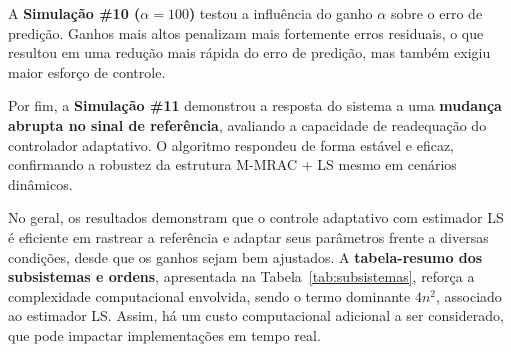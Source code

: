 \documentclass[10pt]{article}
\begin{document}
A \textbf{Simulação \#10 ($\alpha = 100$)} testou a influência do ganho $\alpha$ sobre o erro de predição. Ganhos mais altos penalizam mais fortemente erros residuais, o que resultou em uma redução mais rápida do erro de predição, mas também exigiu maior esforço de controle.

Por fim, a \textbf{Simulação \#11} demonstrou a resposta do sistema a uma \textbf{mudança abrupta no sinal de referência}, avaliando a capacidade de readequação do controlador adaptativo. O algoritmo respondeu de forma estável e eficaz, confirmando a robustez da estrutura M-MRAC + LS mesmo em cenários dinâmicos.

No geral, os resultados demonstram que o controle adaptativo com estimador LS é eficiente em rastrear a referência e adaptar seus parâmetros frente a diversas condições, desde que os ganhos sejam bem ajustados. A \textbf{tabela-resumo dos subsistemas e ordens}, apresentada na Tabela~\ref{tab:subsistemas}, reforça a complexidade computacional envolvida, sendo o termo dominante $4n^2$, associado ao estimador LS. Assim, há um custo computacional adicional a ser considerado, que pode impactar implementações em tempo real.
\end{document}
